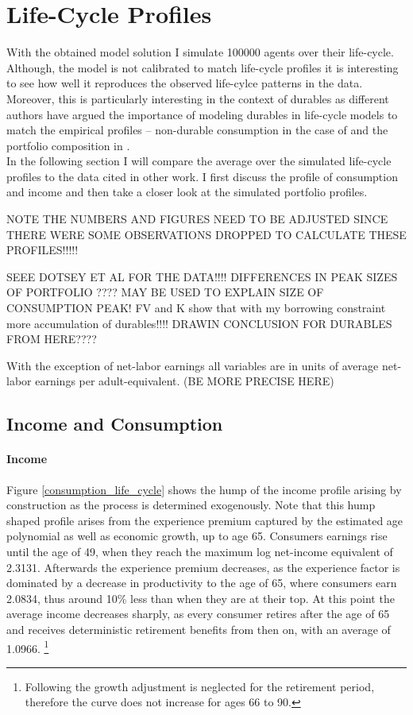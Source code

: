 \documentclass[a4paper,12pt,legno]{article}
\begin{document}
\section{Life-Cycle Profiles}
\label{life_cycle_profiles}

With the obtained model solution I simulate 100000 agents over their life-cycle. Although, the model is not calibrated to match life-cycle profiles it is interesting to see how well it reproduces the observed life-cylce patterns in the data. Moreover, this is particularly interesting in the context of durables as different authors have argued the importance of modeling durables in life-cycle models to match the empirical profiles \--- non-durable consumption in the case of \cite{FV&K2011} and the portfolio composition in \cite{yang2009}. \\
In the following section I will compare the average over the simulated life-cycle profiles to the data cited in other work. I first discuss the profile of consumption and income and then take a closer look at the simulated portfolio profiles. 

NOTE THE NUMBERS AND FIGURES NEED TO BE ADJUSTED SINCE THERE WERE SOME OBSERVATIONS DROPPED TO CALCULATE THESE PROFILES!!!!!

SEEE DOTSEY ET AL FOR THE DATA!!!! 
DIFFERENCES IN PEAK SIZES OF PORTFOLIO ???? MAY BE USED TO EXPLAIN SIZE OF CONSUMPTION PEAK! 
FV and K show that with my borrowing constraint more accumulation of durables!!!! 
DRAWIN CONCLUSION FOR DURABLES FROM HERE???? 


With the exception of net-labor earnings all variables are in units of average net-labor earnings per adult-equivalent. (BE MORE PRECISE HERE) 

\subsection{Income and Consumption}

\paragraph{Income} Figure \ref{consumption_life_cycle} shows the hump of the income profile arising by construction as the process is determined exogenously. Note that this hump shaped profile arises from the experience premium captured by the estimated age polynomial as well as economic growth, up to age 65. Consumers earnings rise until the age of 49, when they reach the maximum log net-income equivalent of 2.3131. Afterwards the experience premium decreases, as the experience factor is dominated by a decrease in productivity to the age of 65, where consumers earn 2.0834, thus around 10\% less than when they are at their top. At this point the average income decreases sharply, as every consumer retires after the age of 65 and receives deterministic retirement benefits from then on, with an average of 1.0966. \footnote{Following \cite{hintermaier2011} the growth adjustment is neglected for the retirement period, therefore the curve does not increase for ages 66 to 90.} 
\end{document}
